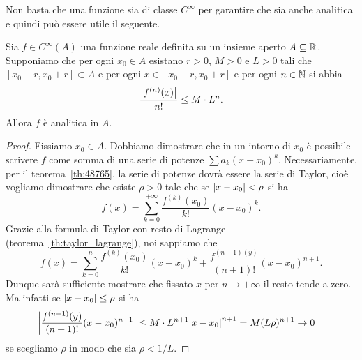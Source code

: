 Non basta che una funzione sia di classe $C^\infty$ per garantire
che sia anche analitica e quindi può essere utile il seguente.

\begin{theorem}
\label{th:criterio_analitica}
Sia $f\in C^\infty(A)$ una funzione reale definita su un
insieme aperto $A\subseteq {\mathbb R}$. Supponiamo che per ogni $x_0\in A$ esistano $r>0$,
$M>0$ e $L>0$ tali che $[x_0-r, x_0+r] \subset A$ e
per ogni $x\in [x_0-r, x_0+r]$ e per
ogni $n\in {\mathbb N}$ si abbia
\[
  \frac{{\left|f^{(n)}(x)\right|}}{n!} \le M\cdot L^n.
\]
Allora $f$ è analitica in $A$.
\end{theorem}
%
\begin{proof}
Fissiamo $x_0\in A$.
Dobbiamo dimostrare che in un intorno di $x_0$ è possibile
scrivere $f$ come somma di una serie di potenze $\sum a_k (x-x_0)^k$.
Necessariamente, per il teorema~\ref{th:48765}, la serie
di potenze dovrà essere la serie di Taylor, cioè vogliamo dimostrare che
esiste $\rho>0$ tale che se ${\left|x-x_0\right|}< \rho$ si ha
\[
  f(x) = \sum_{k=0}^{+\infty} \frac{f^{(k)}(x_0)}{k!}(x-x_0)^k.
\]
Grazie alla formula di Taylor con resto di Lagrange (teorema~\ref{th:taylor_lagrange}),
noi sappiamo che
\[
  f(x) = \sum_{k=0}^{n} \frac{f^{(k)}(x_0)}{k!}(x-x_0)^k
   + \frac{f^{(n+1)(y)}}{(n+1)!}(x-x_0)^{n+1}.
\]
Dunque sarà sufficiente mostrare che fissato $x$ per $n\to +\infty$ il resto
tende a zero.
Ma infatti se ${\left|x-x_0\right|}\le \rho$ si ha
\begin{align*}
 {\left|\frac{f^{(n+1)}(y)}{(n+1)!}(x-x_0)^{n+1}\right|}
 & \le  M\cdot L^{n+1}{\left|x-x_0\right|}^{n+1}
 = M (L\rho)^{n+1}\to 0
\end{align*}
se scegliamo $\rho$ in modo che sia $\rho < 1/L$.
\end{proof}

